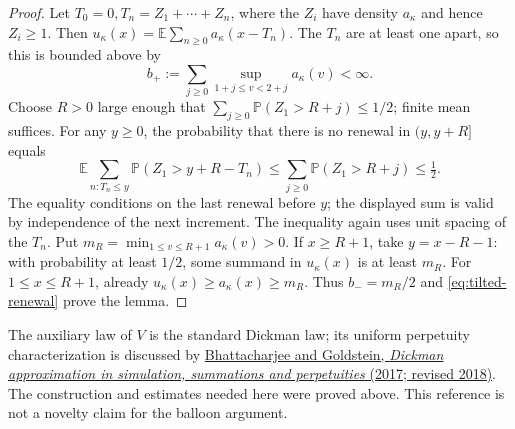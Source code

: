 \documentclass[11pt,letterpaper]{article}
\newcommand{\PP}{\mathbb P}\newcommand{\EE}{\mathbb E}
\begin{document}
\begin{proof}
Let $T_0=0,T_n=Z_1+\cdots+Z_n$, where the $Z_i$ have density
$a_\kappa$ and hence $Z_i\ge1$. Then
$u_\kappa(x)=\EE\sum_{n\ge0}a_\kappa(x-T_n)$.
The $T_n$ are at least one apart, so this is bounded above by
\[
 b_+:=\sum_{j\ge0}\sup_{1+j\le v<2+j}a_\kappa(v)<\infty.
\]
Choose $R>0$ large enough that
$\sum_{j\ge0}\PP(Z_1>R+j)\le1/2$; finite mean suffices. For any $y\ge0$,
the probability that there is no renewal in $(y,y+R]$ equals
\[
 \EE\sum_{n:T_n\le y}\PP(Z_1>y+R-T_n)
 \le\sum_{j\ge0}\PP(Z_1>R+j)\le\tfrac12.
\]
The equality conditions on the last renewal before $y$; the displayed
sum is valid by independence of the next increment. The inequality
again uses unit spacing of the $T_n$.
Put $m_R=\min_{1\le v\le R+1}a_\kappa(v)>0$.
If $x\ge R+1$, take $y=x-R-1$: with probability at least $1/2$,
some summand in $u_\kappa(x)$ is at least $m_R$.
For $1\le x\le R+1$, already $u_\kappa(x)\ge a_\kappa(x)\ge m_R$.
Thus $b_-=m_R/2$ and \eqref{eq:tilted-renewal} prove the lemma.
\end{proof}

The auxiliary law of $V$ is the standard Dickman law; its uniform
perpetuity characterization is discussed by
\href{https://arxiv.org/abs/1706.08192}{Bhattacharjee and Goldstein,
\emph{Dickman approximation in simulation, summations and perpetuities}
(2017; revised 2018)}. The construction and estimates needed here were
proved above. This reference is not a novelty claim for the balloon
argument.
\end{document}

